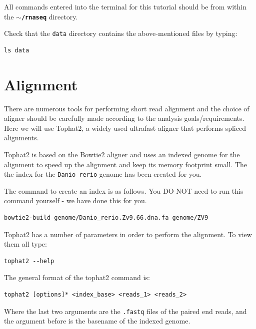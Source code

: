 \begin{warning}
  All commands entered into the terminal for this tutorial should be from within the
  \textbf{\texttt{$\sim$/rnaseq}} directory.
\end{warning}

\begin{steps}
Check that the \texttt{data} directory contains the above-mentioned files by typing:
\begin{lstlisting}
ls data
\end{lstlisting}
\end{steps}

\section{Alignment}
There are numerous tools for performing short read alignment and the choice of aligner
should be carefully made according to the analysis goals/requirements. Here we will
use Tophat2, a widely used ultrafast aligner that performs spliced alignments.

Tophat2 is based on the Bowtie2 aligner and uses an indexed genome for the
alignment to speed up the alignment and keep its memory footprint small. 
The the index for the \texttt{Danio rerio} genome has been created for you. 

\begin{warning}
The command to create an index is as follows. You DO NOT need to run this command
yourself - we have done this for you.
\begin{lstlisting}
bowtie2-build genome/Danio_rerio.Zv9.66.dna.fa genome/ZV9
\end{lstlisting}
\end{warning}

\begin{steps}
Tophat2 has a number of parameters in order to perform the alignment. To view them all type:
\begin{lstlisting}
tophat2 --help
\end{lstlisting}
\end{steps}

\begin{information}
The general format of the tophat2 command is:
\begin{lstlisting}[style=command_syntax]
tophat2 [options]* <index_base> <reads_1> <reads_2>
\end{lstlisting}

Where the last two arguments are the \texttt{.fastq} files of the paired end
reads, and the argument before is the basename of the indexed genome.
\end{information}

